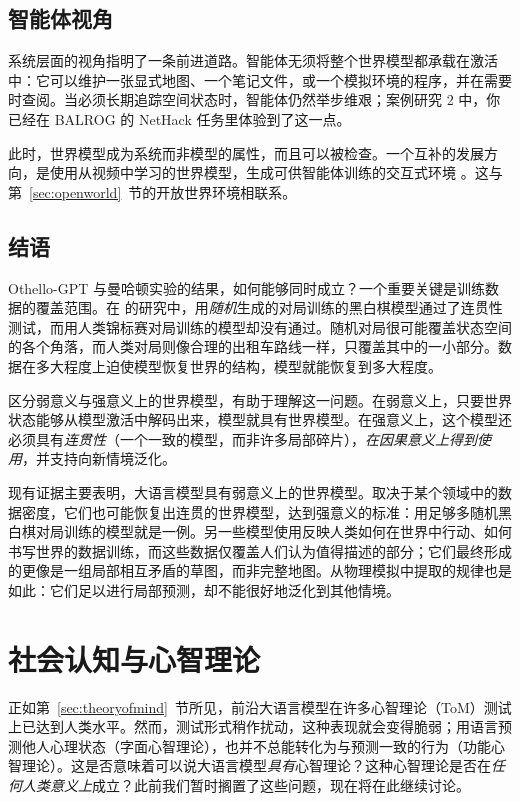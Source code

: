\subsection{智能体视角}
系统层面的视角指明了一条前进道路。智能体无须将整个世界模型都承载在激活中：它可以维护一张显式地图、一个笔记文件，或一个模拟环境的程序，并在需要时查阅。当必须长期追踪空间状态时，智能体仍然举步维艰；案例研究 2 中，你已经在 BALROG 的 NetHack 任务里体验到了这一点。

此时，世界模型成为系统而非模型的属性，而且可以被检查。一个互补的发展方向，是使用从视频中学习的世界模型，生成可供智能体训练的交互式环境 \citep{bruce2024genie}。这与第~\ref{sec:openworld}~节的开放世界环境相联系。

\subsection{结语}
Othello-GPT 与曼哈顿实验的结果，如何能够同时成立？一个重要关键是训练数据的覆盖范围。在 \citet{vafa2024eval} 的研究中，用\emph{随机}生成的对局训练的黑白棋模型通过了连贯性测试，而用人类锦标赛对局训练的模型却没有通过。随机对局很可能覆盖状态空间的各个角落，而人类对局则像合理的出租车路线一样，只覆盖其中的一小部分。数据在多大程度上迫使模型恢复世界的结构，模型就能恢复到多大程度。

区分弱意义与强意义上的世界模型，有助于理解这一问题。在弱意义上，只要世界状态能够从模型激活中解码出来，模型就具有世界模型。在强意义上，这个模型还必须具有\emph{连贯性}（一个一致的模型，而非许多局部碎片），\emph{在因果意义上得到使用}，并支持向新情境泛化。

现有证据主要表明，大语言模型具有弱意义上的世界模型。取决于某个领域中的数据密度，它们也可能恢复出连贯的世界模型，达到强意义的标准：用足够多随机黑白棋对局训练的模型就是一例。另一些模型使用反映人类如何在世界中行动、如何书写世界的数据训练，而这些数据仅覆盖人们认为值得描述的部分；它们最终形成的更像是一组局部相互矛盾的草图，而非完整地图。从物理模拟中提取的规律也是如此：它们足以进行局部预测，却不能很好地泛化到其他情境。

\section{社会认知与心智理论}\label{sec:tomcognition}\label{sec:tomcog}
正如第~\ref{sec:theoryofmind}~节所见，前沿大语言模型在许多心智理论（ToM）测试上已达到人类水平。然而，测试形式稍作扰动，这种表现就会变得脆弱；用语言预测他人心理状态（字面心智理论），也并不总能转化为与预测一致的行为（功能心智理论）。这是否意味着可以说大语言模型\emph{具有}心智理论？这种心智理论是否在\emph{任何人类意义上}成立？此前我们暂时搁置了这些问题，现在将在此继续讨论。


